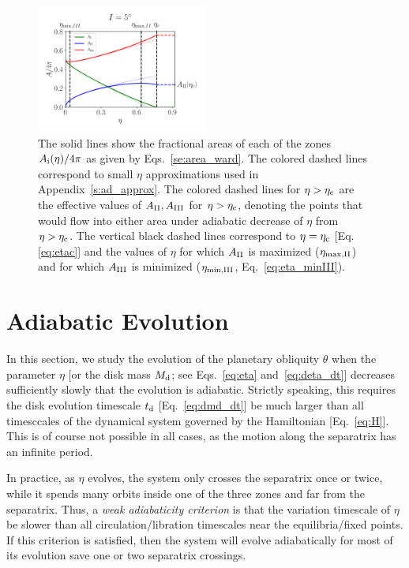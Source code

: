 \documentclass[
        fleqn,
        usenatbib,
    ]{mnras}
\begin{document}
\begin{figure}
    \centering
    \includegraphics[width=0.5\textwidth]{plots_diskdisp/1_areas.png}
    \caption{The solid lines show the fractional areas of each of the zones
    $A_{\rm i}(\eta) / 4\pi$ as given by Eqs.~\eqref{se:area_ward}. The colored
    dashed lines correspond to small $\eta$ approximations used in
    Appendix~\ref{s:ad_approx}. The colored dashed lines for $\eta > \eta_{\rm
    c}$ are the effective values of $A_{\rm II}, A_{\rm III}$ for $\eta >
    \eta_{\rm c}$, denoting the points that would flow into either area under
    adiabatic decrease of $\eta$ from $\eta > \eta_{\rm c}$. The vertical black
    dashed lines correspond to $\eta = \eta_{\rm c}$ [Eq.\eqref{eq:etac}] and
    the values of $\eta$ for which $A_{\rm II}$ is maximized ($\eta_{\rm \max,
    II}$) and for which $A_{\rm III}$ is minimized ($\eta_{\rm \min, III}$,
    Eq.~\eqref{eq:eta_minIII}).}\label{fig:eq_areas}
\end{figure}

\section{Adiabatic Evolution}\label{s:ad}

In this section, we study the evolution of the planetary obliquity $\theta$ when
the parameter $\eta$ [or the disk mass $M_{\rm d}$; see Eqs.~\eqref{eq:eta}
and~\eqref{eq:deta_dt}] decreases sufficiently slowly that the evolution is
adiabatic. Strictly speaking, this requires the disk evolution timescale $t_{\rm
d}$ [Eq.~\eqref{eq:dmd_dt}] be much larger than all timesccales of the dynamical
system governed by the Hamiltonian [Eq.~\eqref{eq:H}]. This is of course not
possible in all cases, as the motion along the separatrix has an infinite
period.

In practice, as $\eta$ evolves, the system only crosses the separatrix once or
twice, while it spends many orbits inside one of the three zones and far from
the separatrix. Thus, a \emph{weak adiabaticity criterion} is that the variation
timescale of $\eta$ be slower than all circulation/libration timescales near the
equilibria/fixed points. If this criterion is satisfied, then the system will
evolve adiabatically for most of its evolution save one or two separatrix
crossings.
\end{document}

